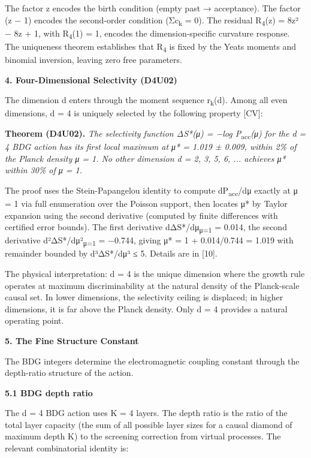 \documentclass[12pt,a4paper]{article}
\begin{document}
The factor z encodes the birth condition (empty past → acceptance). The
factor (z − 1) encodes the second-order condition (Σc\textsubscript{k} =
0). The residual R\textsubscript{4}(z) = 8z² − 8z + 1, with
R\textsubscript{4}(1) = 1, encodes the dimension-specific curvature
response. The uniqueness theorem establishes that R\textsubscript{4} is
fixed by the Yeats moments and binomial inversion, leaving zero free
parameters.

\textbf{4. Four-Dimensional Selectivity (D4U02)}

The dimension d enters through the moment sequence
r\textsubscript{k}(d). Among all even dimensions, d = 4 is uniquely
selected by the following property {[}CV{]}:

\textbf{Theorem (D4U02).} \emph{The selectivity function ΔS*(μ) = −log
P}\textsubscript{acc}\emph{(μ) for the d = 4 BDG action has its first
local maximum at μ* = 1.019 ± 0.009, within 2\% of the Planck density μ
= 1. No other dimension d = 2, 3, 5, 6, ... achieves μ* within 30\% of μ
= 1.}

The proof uses the Stein-Papangelou identity to compute
dP\textsubscript{acc}/dμ exactly at μ = 1 via full enumeration over the
Poisson support, then locates μ* by Taylor expansion using the second
derivative (computed by finite differences with certified error bounds).
The first derivative dΔS*/dμ\textbar{}\textsubscript{μ=1} = 0.014, the
second derivative d²ΔS*/dμ²\textbar{}\textsubscript{μ=1} = −0.744,
giving μ* = 1 + 0.014/0.744 = 1.019 with remainder bounded by
\textbar d³ΔS*/dμ³\textbar{} ≤ 5. Details are in {[}10{]}.

The physical interpretation: d = 4 is the unique dimension where the
growth rule operates at maximum discriminability at the natural density
of the Planck-scale causal set. In lower dimensions, the selectivity
ceiling is displaced; in higher dimensions, it is far above the Planck
density. Only d = 4 provides a natural operating point.

\textbf{5. The Fine Structure Constant}

The BDG integers determine the electromagnetic coupling constant through
the depth-ratio structure of the action.

\textbf{5.1 BDG depth ratio}

The d = 4 BDG action uses K = 4 layers. The depth ratio is the ratio of
the total layer capacity (the sum of all possible layer sizes for a
causal diamond of maximum depth K) to the screening correction from
virtual processes. The relevant combinatorial identity is:
\end{document}
